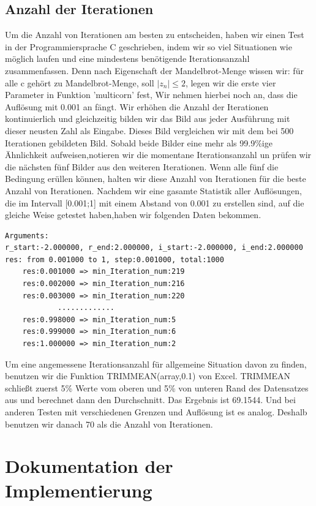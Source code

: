 \documentclass[course=erap]{aspdoc}
\begin{document}
\subsection{Anzahl der Iterationen}
Um die Anzahl von Iterationen am besten zu entscheiden, haben wir einen Test in der Programmiersprache C geschrieben, indem wir so viel Situationen wie möglich laufen und eine mindestens benötigende Iterationsanzahl zusammenfassen. Denn nach Eigenschaft der Mandelbrot-Menge wissen wir: für alle c gehört zu Mandelbrot-Menge, soll $|z_n| \leq 2$, legen wir die erste vier Parameter in Funktion 'multicorn' fest, Wir nehmen hierbei noch an, dass die Auflösung mit 0.001 an fängt. Wir erhöhen die Anzahl der Iterationen kontinuierlich und gleichzeitig bilden wir das Bild aus jeder Ausführung mit dieser neusten Zahl als Eingabe. Dieses Bild vergleichen wir mit dem bei 500 Iterationen gebildeten Bild. Sobald beide Bilder eine mehr als 99.9\%ige Ähnlichkeit aufweisen,notieren wir die momentane Iterationsanzahl un prüfen wir die nächsten fünf Bilder aus den weiteren Iterationen. Wenn alle fünf die Bedingung erüllen können, halten wir diese Anzahl von Iterationen für die beste Anzahl von Iterationen. Nachdem wir eine gasamte Statistik aller Auflösungen, die im Intervall [0.001;1] mit einem Abstand von 0.001 zu erstellen sind, auf die gleiche Weise getestet haben,haben wir folgenden Daten bekommen.
\begin{lstlisting}
Arguments:
r_start:-2.000000, r_end:2.000000, i_start:-2.000000, i_end:2.000000
res: from 0.001000 to 1, step:0.001000, total:1000
	res:0.001000 => min_Iteration_num:219
	res:0.002000 => min_Iteration_num:216
	res:0.003000 => min_Iteration_num:220
            .............
	res:0.998000 => min_Iteration_num:5
	res:0.999000 => min_Iteration_num:6
	res:1.000000 => min_Iteration_num:2
\end{lstlisting}
Um eine angemessene Iterationsanzahl für allgemeine Situation davon zu finden, benutzen wir die Funktion TRIMMEAN(array,0.1) von Excel. TRIMMEAN schließt zuerst 5\% Werte vom oberen und 5\% von unteren Rand des Datensatzes aus und berechnet dann den Durchschnitt. Das Ergebnis ist 69.1544. Und bei anderen Testen mit verschiedenen Grenzen und Auflösung ist es analog. Deshalb benutzen wir danach 70 als die Anzahl von Iterationen.
\section{Dokumentation der Implementierung}
\end{document}
